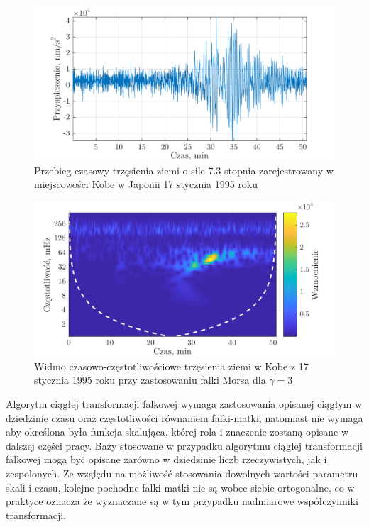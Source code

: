 \begin{figure}[htb!]
\begin{center}
\includegraphics{obrazki/cobe_time}
\caption{Przebieg czasowy trzęsienia ziemi o sile 7.3 stopnia zarejestrowany w miejscowości Kobe w Japonii 17 stycznia 1995 roku \label{fig_cobe_time}}
\end{center}
\end{figure}

\begin{figure}[htb!]
\begin{center}
\includegraphics{obrazki/cobe_cwt}
\caption{Widmo czasowo-częstotliwościowe trzęsienia ziemi w Kobe z 17 stycznia 1995 roku przy zastosowaniu falki Morsa dla $\gamma = 3$ \label{fig_cobe_cwt}}
\end{center}
\end{figure}

Algorytm ciągłej transformacji falkowej wymaga zastosowania opisanej ciągłym w dziedzinie czasu oraz częstotliwości równaniem falki-matki, natomiast nie wymaga aby określona była funkcja skalująca, której rola i znaczenie zostaną opisane w dalszej części pracy. Bazy stosowane w przypadku algorytmu ciągłej transformacji falkowej mogą być opisane zarówno w dziedzinie liczb rzeczywistych, jak i zespolonych. Ze względu na możliwość stosowania dowolnych wartości parametru skali i czasu, kolejne pochodne falki-matki nie są wobec siebie ortogonalne, co w praktyce oznacza że wyznaczane są w tym przypadku nadmiarowe współczynniki transformacji.


